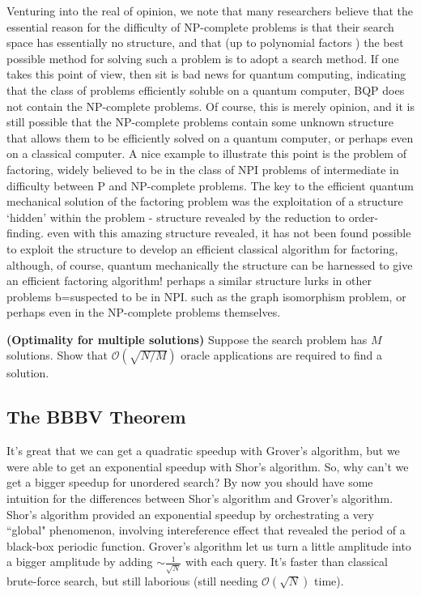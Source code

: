Venturing into the real of opinion, we note that many researchers believe that the essential reason for the difficulty of NP-complete problems is that their search space has essentially no structure, and that (up to polynomial factors ) the best possible method for solving such a problem is to adopt a search method. If one takes this point of view, then sit is bad news for quantum computing, indicating that the class of problems efficiently soluble on a quantum computer, BQP does not contain the NP-complete problems. Of course, this is merely opinion, and it is still possible that the NP-complete problems contain some unknown structure that allows them to be efficiently solved on a quantum computer, or perhaps even on a classical computer. A nice example to illustrate this point is the problem of factoring, widely believed to be in the class of NPI problems of intermediate in difficulty between P and NP-complete problems. The key to the efficient quantum mechanical solution of the factoring problem was the exploitation of a structure `hidden' within the problem - structure revealed by the reduction to order-finding. even with this amazing structure revealed, it has not been found possible to exploit the structure to develop an efficient classical algorithm for factoring, although, of course, quantum mechanically the structure can be harnessed to give an efficient factoring algorithm! perhaps a similar structure lurks in other problems b=suspected to be in NPI. such as the graph isomorphism problem, or perhaps even in the NP-complete problems themselves.

\begin{example}
    \textbf{(Optimality for multiple solutions)} Suppose the search problem has $M$ solutions. Show that $\mathcal{O}(\sqrt{N/M})$ oracle applications are required to find a solution.
\end{example}

\subsection{The BBBV Theorem}
It's great that we can get a quadratic speedup with Grover's algorithm, but we were able to get an exponential speedup with Shor's algorithm. So, why can't we get a bigger speedup for unordered search? By now you should have some intuition for the differences between Shor's algorithm and Grover's algorithm. Shor's algorithm provided an exponential speedup by orchestrating a very ``global" phenomenon, involving intereference effect that revealed the period of a black-box periodic function. Grover's algorithm let us turn a little amplitude into a bigger amplitude by adding $\sim \frac{1}{\sqrt{N}}$ with each query. It's faster than classical brute-force search, but still laborious (still needing $\mathcal{O}(\sqrt{N})$ time).

